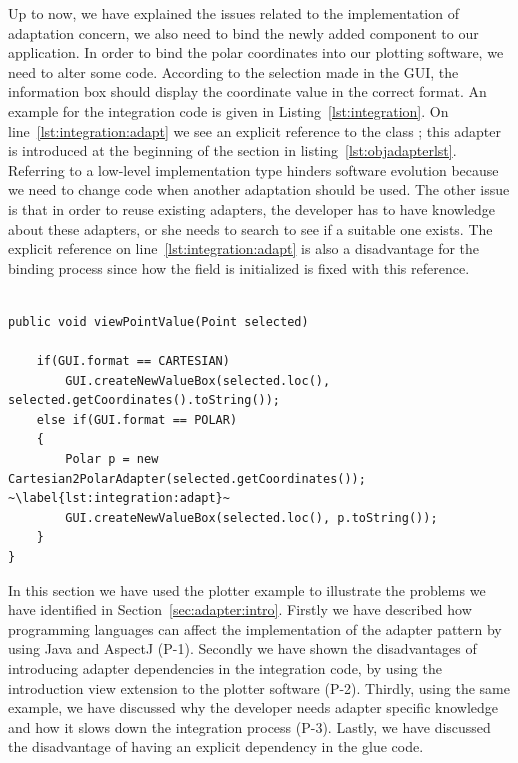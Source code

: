 Up to now, we have explained the issues related to the implementation of adaptation concern, we also need to bind the newly added component to our application.
In order to bind the polar coordinates into our plotting software, we need to alter some code. 
According to the selection made in the GUI, the information box should display the coordinate value in the correct format. 
An example for the integration code is given in Listing~\ref{lst:integration}.
On line~\ref{lst:integration:adapt} we see an explicit reference to the class ; this adapter is introduced at the beginning of the section in listing~\ref{lst:objadapterlst}.
Referring to a low-level implementation type hinders software evolution because we need to change code when another adaptation should be used. 
The other issue is that in order to reuse existing adapters, the developer has to have knowledge about these adapters, or she needs to search to see if a suitable one exists. 
The explicit reference on line~\ref{lst:integration:adapt} is also a disadvantage for the binding process since how the  field is initialized is fixed with this reference.


\begin{lstlisting}[float, caption={The integration of Polar coordinates}, label={lst:integration}]

public void viewPointValue(Point selected)

	if(GUI.format == CARTESIAN)
		GUI.createNewValueBox(selected.loc(), selected.getCoordinates().toString());
	else if(GUI.format == POLAR)
	{
		Polar p = new Cartesian2PolarAdapter(selected.getCoordinates()); ~\label{lst:integration:adapt}~
		GUI.createNewValueBox(selected.loc(), p.toString());
	}
}
\end{lstlisting}

In this section we have used the plotter example to illustrate the problems we have identified in Section~\ref{sec:adapter:intro}. 
Firstly we have described how programming languages can affect the implementation of the adapter pattern by using Java and AspectJ (P-1). 
Secondly we have shown the disadvantages of introducing adapter dependencies in the integration code, by using the introduction  view extension to the plotter software (P-2).
Thirdly, using the same example, we have discussed why the developer needs adapter specific knowledge and how it slows down the integration process (P-3). 
Lastly, we have discussed the disadvantage of having an explicit dependency in the glue code.


